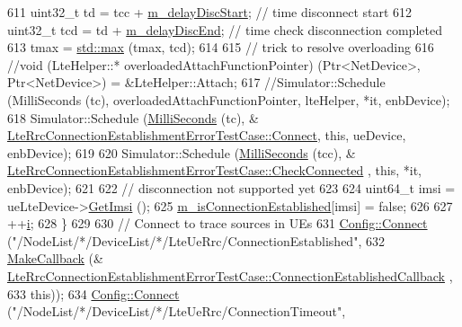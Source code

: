 \begin{DoxyCode}
611       uint32\_t td =  tcc + \hyperlink{classLteRrcConnectionEstablishmentTestCase_ac6182c550ef96e540079572673417262}{m\_delayDiscStart}; \textcolor{comment}{// time disconnect start}
612       uint32\_t tcd = td + \hyperlink{classLteRrcConnectionEstablishmentTestCase_acf9e0e4fe98974cc1139311de09064d2}{m\_delayDiscEnd}; \textcolor{comment}{// time check disconnection completed}
613       tmax = \hyperlink{80211b_8c_affe776513b24d84b39af8ab0930fef7f}{std::max} (tmax, tcd);
614 
615       \textcolor{comment}{// trick to resolve overloading}
616       \textcolor{comment}{//void (LteHelper::* overloadedAttachFunctionPointer) (Ptr<NetDevice>, Ptr<NetDevice>) =
       &LteHelper::Attach;}
617       \textcolor{comment}{//Simulator::Schedule (MilliSeconds (tc), overloadedAttachFunctionPointer, lteHelper, *it,
       enbDevice);}
618       Simulator::Schedule (\hyperlink{group__timecivil_gaf26127cf4571146b83a92ee18679c7a9}{MilliSeconds} (tc), &
      \hyperlink{classLteRrcConnectionEstablishmentTestCase_acc46d31ee3a048f2d0a4b55a8c93f0de}{LteRrcConnectionEstablishmentErrorTestCase::Connect}, \textcolor{keyword}{
      this}, ueDevice, enbDevice);
619 
620       Simulator::Schedule (\hyperlink{group__timecivil_gaf26127cf4571146b83a92ee18679c7a9}{MilliSeconds} (tcc), &
      \hyperlink{classLteRrcConnectionEstablishmentTestCase_a43216a40683fd19ad571edd9d0e8600c}{LteRrcConnectionEstablishmentErrorTestCase::CheckConnected}
      , \textcolor{keyword}{this}, *it, enbDevice);
621 
622       \textcolor{comment}{// disconnection not supported yet}
623 
624       uint64\_t imsi = ueLteDevice->\hyperlink{classns3_1_1LteUeNetDevice_a673405bfed4b45c5714f17b0c3bad334}{GetImsi} ();
625       \hyperlink{classLteRrcConnectionEstablishmentTestCase_a1516a2a155242462521febbc223b6cfb}{m\_isConnectionEstablished}[imsi] = \textcolor{keyword}{false};
626 
627       ++\hyperlink{bernuolliDistribution_8m_a6f6ccfcf58b31cb6412107d9d5281426}{i};
628     \}
629 
630   \textcolor{comment}{// Connect to trace sources in UEs}
631   \hyperlink{group__config_ga4014f151241cd0939b6cb64409605736}{Config::Connect} (\textcolor{stringliteral}{"/NodeList/*/DeviceList/*/LteUeRrc/ConnectionEstablished"},
632                    \hyperlink{group__makecallbackmemptr_ga9376283685aa99d204048d6a4b7610a4}{MakeCallback} (&
      \hyperlink{classLteRrcConnectionEstablishmentTestCase_a39f38708e4239b1c704c2cc094cbf360}{LteRrcConnectionEstablishmentErrorTestCase::ConnectionEstablishedCallback}
      ,
633                                  \textcolor{keyword}{this}));
634   \hyperlink{group__config_ga4014f151241cd0939b6cb64409605736}{Config::Connect} (\textcolor{stringliteral}{"/NodeList/*/DeviceList/*/LteUeRrc/ConnectionTimeout"},

\end{DoxyCode}
